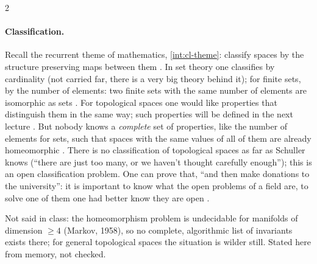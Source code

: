 \begin{paracol}{2}
\paragraph{Classification.} Recall the recurrent theme of mathematics, \cref{int:cl-theme}: classify spaces by the structure preserving maps between them
. In set theory one classifies by cardinality (not carried far, there is a very big theory behind it); for finite sets, by the number of
elements: two finite sets with the same number of elements are isomorphic as sets .
For topological spaces one would like properties that distinguish them in the same way; such properties will be defined in the next lecture
. But nobody knows a \emph{complete} set of properties, like the number of elements for sets, such that spaces with the same
values of all of them are already homeomorphic . There is no classification of topological spaces as far as Schuller
knows (``there are just too many, or we haven't thought carefully enough''); this is an open classification problem. One can prove that, ``and then make donations
to the university'': it is important to know what the open problems of a field are, to solve one of them one had better know they are open
.
\begin{coursenote}
Not said in class: the homeomorphism problem is undecidable for manifolds of dimension $\ge4$ (Markov, 1958), so no complete, algorithmic list
of invariants exists there; for general topological spaces the situation is wilder still. Stated here from memory, not checked.
\end{coursenote}


\end{paracol}

